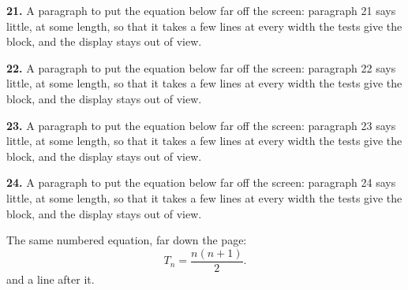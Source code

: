 \noindent\textbf{21.} A paragraph to put the equation below far off the screen: paragraph 21
says little, at some length, so that it takes a few lines at every width
the tests give the block, and the display stays out of view.

\noindent\textbf{22.} A paragraph to put the equation below far off the screen: paragraph 22
says little, at some length, so that it takes a few lines at every width
the tests give the block, and the display stays out of view.

\noindent\textbf{23.} A paragraph to put the equation below far off the screen: paragraph 23
says little, at some length, so that it takes a few lines at every width
the tests give the block, and the display stays out of view.

\noindent\textbf{24.} A paragraph to put the equation below far off the screen: paragraph 24
says little, at some length, so that it takes a few lines at every width
the tests give the block, and the display stays out of view.

The same numbered equation, far down the page:
\begin{equation}
  T_n = \frac{n(n+1)}{2}.
\end{equation}
and a line after it.
